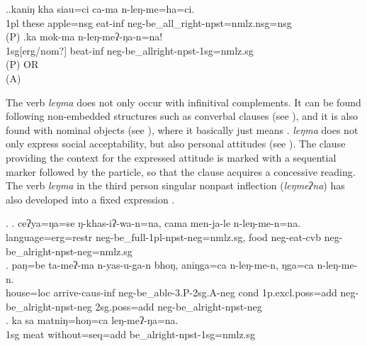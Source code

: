 \ex.\ag.kaniŋ kha siau=ci ca-ma n-leŋ-me=ha=ci.\\
{\sc 1pl} these apple{\sc =nsg} eat{\sc -inf} {\sc neg-}be\_all\_right{\sc -npst=nmlz.nsg=nsg}\\
 (P)
\bg.ka mok-ma n-leŋ-meʔ-ŋa-n=na!\\
{\sc 1sg[erg/nom?]} beat{\sc -inf} {\sc neg-}be\_allright{\sc -npst-1sg=nmlz.sg}\\
 (P) OR\\
 (A)


The verb \emph{leŋma} does not only occur with infinitival complements. It can be found following non-embedded structures such as converbal clauses (see \Next[a]), and it is also found with nominal objects (see \Next[b]), where it basically just means . \emph{leŋma} does not only express social acceptability, but also personal attitudes (see \Next[c]). The clause providing the context for the expressed attitude is marked with a sequential marker followed by the  particle, so that the clause acquires a concessive reading. The verb \emph{leŋma} in the third person singular nonpast inflection (\emph{leŋmeʔna}) has also developed into a fixed expression . 
	

\ex. \ag. ceʔya=ŋa=se ŋ-khas-iʔ-wa-n=na, cama men-ja-le n-leŋ-me-n=na.\\
		language{\sc =erg=restr} {\sc neg}-be\_full-{\sc 1pl-npst-neg=nmlz.sg}, food	 {\sc neg-}eat{\sc -cvb}	{\sc neg-}be\_alright{\sc [3sg]-npst-neg=nmlz.sg}\\ 
\bg. paŋ=be     ta-meʔ-ma           n-yas-u-ga-n bhoŋ,  aniŋga=ca n-leŋ-me-n, ŋga=ca n-leŋ-me-n.\\
	house{\sc =loc} arrive{\sc -caus-inf} {\sc neg-}be\_able-{\sc 3.P-2sg.A-neg} {\sc cond} {\sc 1p.excl.poss=add} {\sc neg}-be\_alright{\sc [3sg]-npst-neg} {\sc 2sg.poss=add} {\sc neg}-be\_alright{\sc [3sg]-npst-neg}\\
	\bg. ka sa matniŋ=hoŋ=ca leŋ-meʔ-ŋa=na.\\
{\sc 1sg} meat without{\sc =seq=add} be\_alright{\sc -npst-1sg=nmlz.sg}\\



